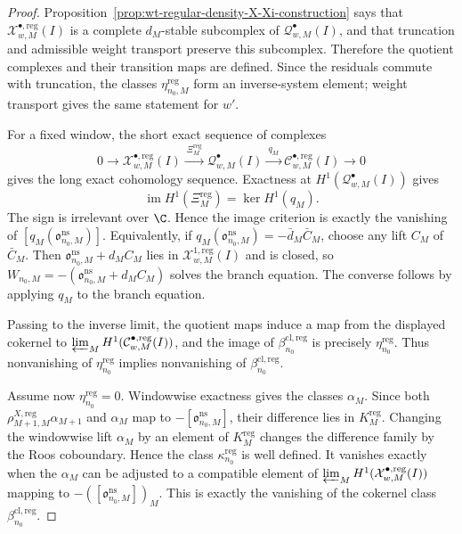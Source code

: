 \begin{proof}
  Proposition~\ref{prop:wt-regular-density-X-Xi-construction} says that
  \(\mathcal X^{\bullet,\mathrm{reg}}_{w,M}(I)\) is a complete
  \(d_M\)-stable subcomplex of \(\mathcal Q^\bullet_{w,M}(I)\), and that
  truncation and admissible weight transport preserve this subcomplex.
  Therefore the quotient complexes and their transition maps are defined.
  Since the residuals commute with truncation, the classes
  \(\eta^{\mathrm{reg}}_{n_0,M}\) form an inverse-system element; weight
  transport gives the same statement for \(w'\).

  For a fixed window, the short exact sequence of complexes
  \[
    0\longrightarrow
    \mathcal X^{\bullet,\mathrm{reg}}_{w,M}(I)
    \xrightarrow{\ \Xi^{\mathrm{reg}}_M\ }
    \mathcal Q^\bullet_{w,M}(I)
    \xrightarrow{\ q_M\ }
    \mathcal C^{\bullet,\mathrm{reg}}_{w,M}(I)
    \longrightarrow0
  \]
  gives the long exact cohomology sequence.  Exactness at
  \(H^1(\mathcal Q^\bullet_{w,M}(I))\) gives
  \[
    \operatorname{im}H^1(\Xi^{\mathrm{reg}}_M)
      =
    \ker H^1(q_M).
  \]
  The sign is irrelevant over \(\C\).  Hence the image criterion is
  exactly the vanishing of
  \([q_M(\mathfrak o^{\mathrm{ns}}_{n_0,M})]\).  Equivalently, if
  \(q_M(\mathfrak o^{\mathrm{ns}}_{n_0,M})=-\bar d_M\bar C_M\), choose
  any lift \(C_M\) of \(\bar C_M\).  Then
  \(\mathfrak o^{\mathrm{ns}}_{n_0,M}+d_MC_M\) lies in
  \(\mathcal X^{1,\mathrm{reg}}_{w,M}(I)\) and is closed, so
  \(W_{n_0,M}=-(\mathfrak o^{\mathrm{ns}}_{n_0,M}+d_MC_M)\) solves the
  branch equation.  The converse follows by applying \(q_M\) to the
  branch equation.

  Passing to the inverse limit, the quotient maps induce a map from the
  displayed cokernel to
  \(\varprojlim_MH^1(\mathcal C^{\bullet,\mathrm{reg}}_{w,M}(I))\), and
  the image of \(\beta^{\mathrm{cl},\mathrm{reg}}_{n_0}\) is precisely
  \(\eta^{\mathrm{reg}}_{n_0}\).  Thus nonvanishing of
  \(\eta^{\mathrm{reg}}_{n_0}\) implies nonvanishing of
  \(\beta^{\mathrm{cl},\mathrm{reg}}_{n_0}\).

  Assume now \(\eta^{\mathrm{reg}}_{n_0}=0\).  Windowwise exactness gives
  the classes \(\alpha_M\).  Since both
  \(\rho^{X,\mathrm{reg}}_{M+1,M}\alpha_{M+1}\) and \(\alpha_M\) map to
  \(-[\mathfrak o^{\mathrm{ns}}_{n_0,M}]\), their difference lies in
  \(K^{\mathrm{reg}}_M\).  Changing the windowwise lift \(\alpha_M\) by
  an element of \(K^{\mathrm{reg}}_M\) changes the difference family by
  the Roos coboundary.  Hence the class
  \(\kappa^{\mathrm{reg}}_{n_0}\) is well defined.  It vanishes exactly
  when the \(\alpha_M\) can be adjusted to a compatible element of
  \(\varprojlim_MH^1(\mathcal X^{\bullet,\mathrm{reg}}_{w,M}(I))\)
  mapping to
  \(-([\mathfrak o^{\mathrm{ns}}_{n_0,M}])_M\).  This is exactly the
  vanishing of the cokernel class
  \(\beta^{\mathrm{cl},\mathrm{reg}}_{n_0}\).


\end{proof}
